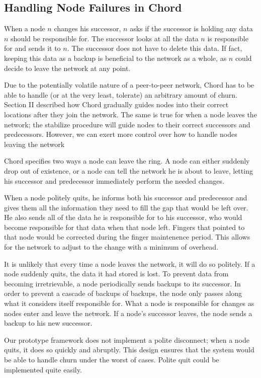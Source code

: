 \documentclass[10pt, conference, compsocconf]{IEEEtran}
\begin{document}
\subsection{Handling Node Failures in Chord}
When a node $n$ changes his successor, $n$ asks if the successor is holding any data $n$ should be responsible for.  The successor looks at all the data $n$ is responsible for and sends it  to $n$.  The successor does not have to delete this data. If fact, keeping this data as a backup is beneficial to the network as a whole, as $n$ could decide to leave the network at any point. 

Due to the potentially volatile nature of a peer-to-peer network, Chord has to be able to handle (or at the very least, tolerate) an arbitrary amount of churn.  Section II described how Chord gradually guides nodes into their correct locations after they join the network.  The same is true for when a node leaves the network; the stabilize procedure will guide nodes to their correct successors and predecessors.  However, we can exert more control over how to handle nodes leaving the network

Chord specifies two ways a node can leave the ring.  A node can either suddenly drop out of existence, or a node can tell the network he is about to leave, letting his successor and predecessor immediately perform the needed changes.

When a node politely quits, he informs both his successor and predecessor and gives them all the information they need to fill the gap that would be left over. He also sends all of the data he is responsible for to his successor, who would become responsible for that data when that node left.  Fingers that pointed to that node would be corrected during the finger maintenence period.  This allows for the network to adjust to the change with a minimum of overhead.

It is unlikely that every time a node leaves the network, it will do so politely.  If a node suddenly quits, the data it had stored is lost. To prevent data from becoming irretrievable, a node periodically sends backups to its successor.  In order to prevent a cascade of backups of backups, the node only passes along what it considers itself responsible for.  What a node is responsible for changes as nodes enter and leave the network.  If a node's successor leaves, the node sends a backup to his new successor. 

Our prototype framework does not implement a polite disconnect;  when a node quits, it does so quickly and abruptly.  This design ensures that the  system would be able to handle churn under the worst of cases.  Polite quit could be implemented quite easily.
\end{document}
